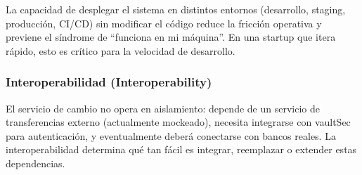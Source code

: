 La capacidad de desplegar el sistema en distintos entornos (desarrollo, staging, producción, CI/CD) sin modificar el código reduce la fricción operativa y previene el síndrome de ``funciona en mi máquina''. En una startup que itera rápido, esto es crítico para la velocidad de desarrollo.

\subsubsection{Interoperabilidad (Interoperability)}

El servicio de cambio no opera en aislamiento: depende de un servicio de transferencias externo (actualmente mockeado), necesita integrarse con vaultSec para autenticación, y eventualmente deberá conectarse con bancos reales. La interoperabilidad determina qué tan fácil es integrar, reemplazar o extender estas dependencias.
